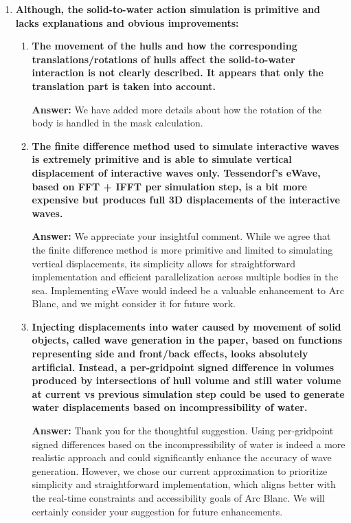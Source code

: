 \documentclass{article}
\newcommand{\answer}[1]{\textbf{\textcolor{answercolor}{Answer:}} \textcolor{answercolor}{#1}}
\begin{document}
\begin{enumerate}[label=\textbf{\arabic*.}]
    \item \textbf{Although, the solid-to-water action simulation is primitive and lacks explanations and obvious improvements:}
    
    \begin{enumerate}[label=\textbf{\arabic*.}]
        \item \textbf{The movement of the hulls and how the corresponding translations/rotations of hulls affect the solid-to-water interaction is not clearly described. It appears that only the translation part is taken into account.}
        
        \answer{We have added more details about how the rotation of the body is handled in the mask calculation.}

        \item \textbf{The finite difference method used to simulate interactive waves is extremely primitive and is able to simulate vertical displacement of interactive waves only. Tessendorf's eWave, based on FFT + IFFT per simulation step, is a bit more expensive but produces full 3D displacements of the interactive waves.}
        
        \answer{We appreciate your insightful comment. While we agree that the finite difference method is more primitive and limited to simulating vertical displacements, its simplicity allows for straightforward implementation and efficient parallelization across multiple bodies in the sea. Implementing eWave would indeed be a valuable enhancement to Arc Blanc, and we might consider it for future work.}

        \item \textbf{Injecting displacements into water caused by movement of solid objects, called wave generation in the paper, based on functions representing side and front/back effects, looks absolutely artificial. Instead, a per-gridpoint signed difference in volumes produced by intersections of hull volume and still water volume at current vs previous simulation step could be used to generate water displacements based on incompressibility of water.}
        
        \answer{Thank you for the thoughtful suggestion. Using per-gridpoint signed differences based on the incompressibility of water is indeed a more realistic approach and could significantly enhance the accuracy of wave generation. However, we chose our current approximation to prioritize simplicity and straightforward implementation, which aligns better with the real-time constraints and accessibility goals of Arc Blanc. We will certainly consider your suggestion for future enhancements.}


\end{enumerate}
\end{enumerate}
\end{document}
